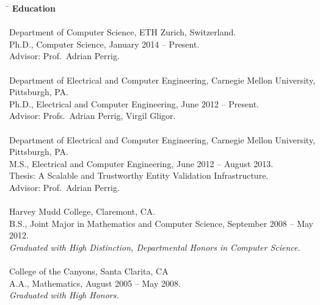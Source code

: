 \documentclass[11pt]{article}
\begin{document}
\begin{tabbing}
\quad\=\kill
{\Large\textbf{Education}}\\\\
Department of Computer Science, ETH Zurich, Switzerland.\\
\>Ph.D., Computer Science, January 2014 -- Present.\\
\>Advisor: Prof.\ Adrian Perrig.\\\\

Department of Electrical and Computer Engineering, Carnegie Mellon University,
Pittsburgh, PA.\\
\>Ph.D., Electrical and Computer Engineering, June 2012 -- Present.\\
\>Advisor: Profs.\ Adrian Perrig, Virgil Gligor.\\\\

Department of Electrical and Computer Engineering, Carnegie Mellon University,
Pittsburgh, PA.\\
\>M.S., Electrical and Computer Engineering, June 2012 -- August 2013.\\
\>Thesis: A Scalable and Trustworthy Entity Validation Infrastructure.\\
\>Advisor: Prof.\ Adrian Perrig.\\\\

Harvey Mudd College, Claremont, CA.\\
\>B.S., Joint Major in Mathematics and Computer Science, September 2008 -- May
2012.\\
\>\emph{Graduated with High Distinction, Departmental Honors in Computer
Science.}\\\\

College of the Canyons, Santa Clarita, CA\\
\>A.A., Mathematics, August 2005 -- May 2008.\\
\>\emph{Graduated with High Honors.}
\end{tabbing}

\setcounter{refs}{1}
\makeatletter
\newcommand{\theref}{\@arabic\c@refs}
\makeatother
\end{document}
